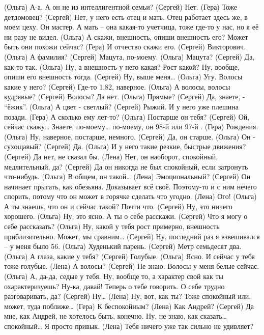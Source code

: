  (Ольга)   А-а. А он не из интеллигентной семьи?
 (Сергей)  Нет.
 (Гера)    Тоже детдомовец?
 (Сергей)  Нет, у него есть отец и мать. Отец работает здесь же, в моем цеху. Он мастер. А мать – она  какая-то учетчица, тоже где-то у нас, но я её ни разу не видел. 
 (Ольга)   А скажи, внешность, опиши внешность его? Может быть они похожи сейчас?
 (Гера)    И отчество скажи его.
 (Сергей)  Викторович.
 (Ольга)   А фамилия?
 (Сергей)  Мацута, по-моему.
 (Ольга)   Мацута? 
 (Сергей)  Да, как-то так.
 (Ольга)   Ну, а внешность у него какая? Рост какой? Ну, вообще, опиши его внешность тогда.
 (Сергей)  Ну, выше меня…
 (Ольга)   Угу. Волосы какие у него?
 (Сергей)  Где-то 1,82, наверное.
 (Ольга)   А волосы, волосы кудрявые?
 (Сергей)  Волосы? Да нет.
 (Ольга)   Прямые?
 (Сергей)  Да, знаете, - ``ёжик''.
 (Ольга)   А цвет - светлый?
 (Сергей)  Рыжий. И у него уже плешина позади.
 (Гера)    А сколько ему лет-то?
 (Ольга)   Постарше он тебя?
 (Сергей)  Ой, сейчас скажу… Знаете, по-моему… по-моему, он 98-й или 97-й .
 (Гера)    Рождения.
 (Ольга)   Ну, наверное, постарше, немного.
 (Сергей)  Да, он старше.
 (Ольга)   Он - сухощавый?
 (Сергей)  Да.
 (Ольга)   И у него такие резкие, быстрые движения?
 (Сергей)  Да нет, не сказал бы.
 (Лена)    Нет, он наоборот, спокойный, медлительный, да?
 (Сергей)  Да он никогда не был спокойный, если затронуть что-нибудь.
 (Ольга)   В общем, он такой…
 (Лена)    Эмоциональный? 
 (Сергей)  Он начинает прыгать, как обезьяна. Доказывает всё своё. Поэтому-то и с ним нечего спорить, потому что он может в горячке сделать что угодно.
 (Лена)    Ого!
 (Ольга)   А ты знаешь, что он и сейчас такой? Почти что.
 (Сергей)  Ну, это ничего хорошего.
 (Ольга)   Ну, это ясно. А ты о себе расскажи.
  (Сергей) Что я могу о себе рассказать?
  (Ольга)  Ну, какой у тебя рост примерно, внешность приблизительно. Может, мы сравним…
 (Сергей)  Ну, последний раз я взвешивался – у меня было 56.
 (Ольга)   Худенький парень.
 (Сергей)  Метр семьдесят два.
 (Ольга)   А глаза, какие у тебя?
 (Сергей)  Голубые.
 (Ольга)   Ясно. И сейчас у тебя тоже голубые.
 (Лена)    А волосы?
 (Сергей)  Не знаю. Волосы у меня белые сейчас.
 (Ольга)   А, да-да, седые у тебя. Ну, вообще то, а характер свой как ты охарактеризуешь? Ну-ка,  давай! Теперь о тебе говорить. О  себе трудно разговаривать, да?
 (Сергей)  Ну…
 (Лена)    Ну, вот, как ты? Тоже спокойный или, может, туда поближе…
 (Гера)    К беспокойным?
 (Лена)    Как Андрей?
 (Сергей)  Да мне, как Андрей, не хотелось быть, конечно. Ну, не знаю, как сказать… спокойный… Я просто привык. 
 (Лена)    Тебя ничего уже так сильно не удивляет?

